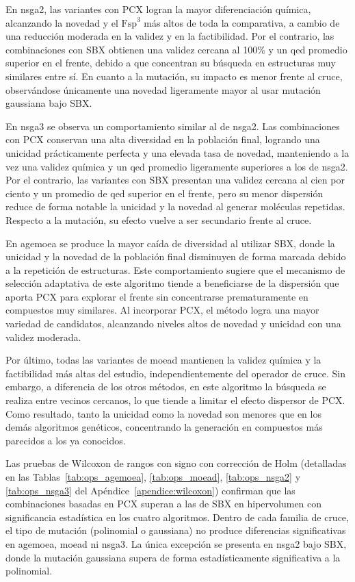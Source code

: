 En \acrshort{nsga2}, las variantes con PCX logran la mayor diferenciación química, alcanzando la novedad y el $\text{Fsp}^3$ más altos de toda la comparativa, a cambio de una reducción moderada en la validez y en la factibilidad. Por el contrario, las combinaciones con SBX obtienen una validez cercana al 100\% y un \gls{qed} promedio superior en el frente, debido a que concentran su búsqueda en estructuras muy similares entre sí. En cuanto a la mutación, su impacto es menor frente al cruce, observándose únicamente una novedad ligeramente mayor al usar mutación gaussiana bajo SBX.

En \acrshort{nsga3} se observa un comportamiento similar al de \acrshort{nsga2}. Las combinaciones con PCX conservan una alta diversidad en la población final, logrando una unicidad prácticamente perfecta y una elevada tasa de novedad, manteniendo a la vez una validez química y un \gls{qed} promedio ligeramente superiores a los de \acrshort{nsga2}. Por el contrario, las variantes con SBX presentan una validez cercana al cien por ciento y un promedio de \gls{qed} superior en el frente, pero su menor dispersión reduce de forma notable la unicidad y la novedad al generar moléculas repetidas. Respecto a la mutación, su efecto vuelve a ser secundario frente al cruce.

En \acrshort{agemoea} se produce la mayor caída de diversidad al utilizar SBX, donde la unicidad y la novedad de la población final disminuyen de forma marcada debido a la repetición de estructuras. Este comportamiento sugiere que el mecanismo de selección adaptativa de este algoritmo tiende a beneficiarse de la dispersión que aporta PCX para explorar el frente sin concentrarse prematuramente en compuestos muy similares. Al incorporar PCX, el método logra una mayor variedad de candidatos, alcanzando niveles altos de novedad y unicidad con una validez moderada.

Por último, todas las variantes de \acrshort{moead} mantienen la validez química y la factibilidad más altas del estudio, independientemente del operador de cruce. Sin embargo, a diferencia de los otros métodos, en este algoritmo la búsqueda se realiza entre vecinos cercanos, lo que tiende a limitar el efecto dispersor de PCX. Como resultado, tanto la unicidad como la novedad son menores que en los demás algoritmos genéticos, concentrando la generación en compuestos más parecidos a los ya conocidos.

Las pruebas de Wilcoxon de rangos con signo con corrección de Holm (detalladas en las Tablas~\ref{tab:ops_agemoea}, \ref{tab:ops_moead}, \ref{tab:ops_nsga2} y \ref{tab:ops_nsga3} del Apéndice~\ref{apendice:wilcoxon}) confirman que las combinaciones basadas en PCX superan a las de SBX en hipervolumen con significancia estadística en los cuatro algoritmos. Dentro de cada familia de cruce, el tipo de mutación (polinomial o gaussiana) no produce diferencias significativas en \acrshort{agemoea}, \acrshort{moead} ni \acrshort{nsga3}. La única excepción se presenta en \acrshort{nsga2} bajo SBX, donde la mutación gaussiana supera de forma estadísticamente significativa a la polinomial.

